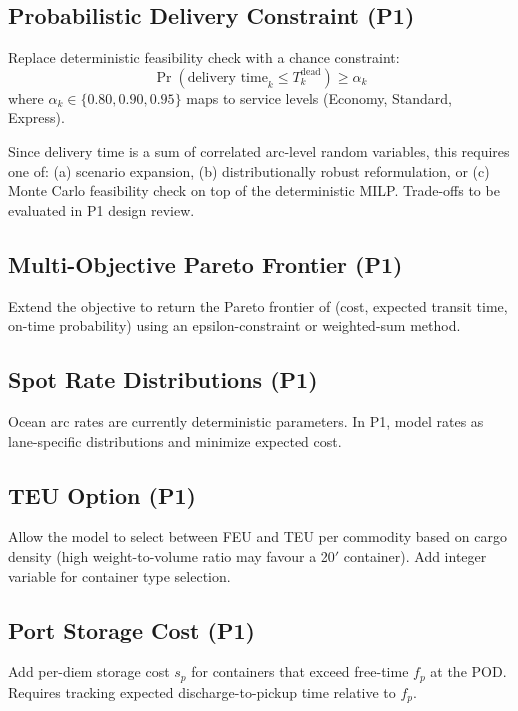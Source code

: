 \documentclass[11pt,a4paper]{article}
\theoremstyle{definition}
\begin{document}
\subsection{Probabilistic Delivery Constraint (P1)}

Replace deterministic feasibility check with a chance constraint:
\[
  \Pr\!\left(\text{delivery time}_k \leq T_k^{\text{dead}}\right) \geq \alpha_k
\]
where $\alpha_k \in \{0.80, 0.90, 0.95\}$ maps to service levels (Economy, Standard, Express).

Since delivery time is a sum of correlated arc-level random variables, this requires
one of: (a) scenario expansion, (b) distributionally robust reformulation, or
(c) Monte Carlo feasibility check on top of the deterministic MILP. Trade-offs to be
evaluated in P1 design review.

\subsection{Multi-Objective Pareto Frontier (P1)}

Extend the objective to return the Pareto frontier of (cost, expected transit time,
on-time probability) using an epsilon-constraint or weighted-sum method.

\subsection{Spot Rate Distributions (P1)}

Ocean arc rates are currently deterministic parameters. In P1, model rates as
lane-specific distributions and minimize expected cost.

\subsection{TEU Option (P1)}

Allow the model to select between FEU and TEU per commodity based on cargo density
(high weight-to-volume ratio may favour a 20$'$ container). Add integer variable
for container type selection.

\subsection{Port Storage Cost (P1)}

Add per-diem storage cost $s_p$ for containers that exceed free-time $f_p$ at the POD.
Requires tracking expected discharge-to-pickup time relative to $f_p$.
\end{document}
